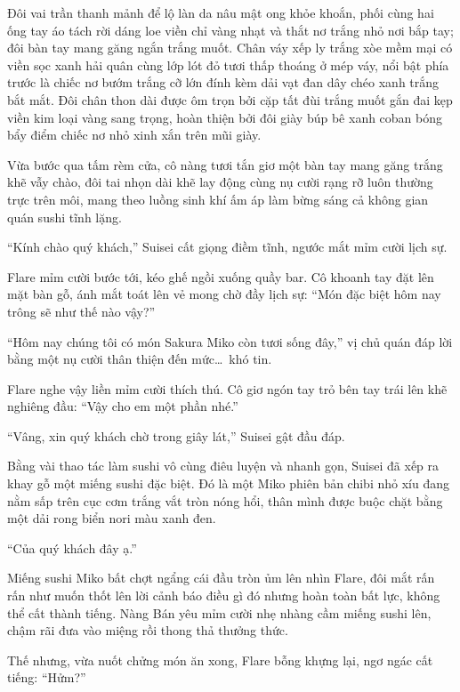 \documentclass[../main.tex]{subfiles}
\begin{document}
Đôi vai trần thanh mảnh để lộ làn da nâu mật ong khỏe khoắn, phối cùng hai ống tay áo tách rời dáng loe viền chỉ vàng nhạt và thắt nơ trắng nhỏ nơi bắp tay; đôi bàn tay mang găng ngắn trắng muốt. Chân váy xếp ly trắng xòe mềm mại có viền sọc xanh hải quân cùng lớp lót đỏ tươi thấp thoáng ở mép váy, nổi bật phía trước là chiếc nơ bướm trắng cỡ lớn đính kèm dải vạt đan dây chéo xanh trắng bắt mắt. Đôi chân thon dài được ôm trọn bởi cặp tất đùi trắng muốt gắn đai kẹp viền kim loại vàng sang trọng, hoàn thiện bởi đôi giày búp bê xanh coban bóng bẩy điểm chiếc nơ nhỏ xinh xắn trên mũi giày.

\chrint

Vừa bước qua tấm rèm cửa, cô nàng tươi tắn giơ một bàn tay mang găng trắng khẽ vẫy chào, đôi tai nhọn dài khẽ lay động cùng nụ cười rạng rỡ luôn thường trực trên môi, mang theo luồng sinh khí ấm áp làm bừng sáng cả không gian quán sushi tĩnh lặng.

``Kính chào quý khách,'' Suisei cất giọng điềm tĩnh, ngước mắt mỉm cười lịch sự.

Flare mỉm cười bước tới, kéo ghế ngồi xuống quầy bar. Cô khoanh tay đặt lên mặt bàn gỗ, ánh mắt toát lên vẻ mong chờ đầy lịch sự: ``Món đặc biệt hôm nay trông sẽ như thế nào vậy?''


``Hôm nay chúng tôi có món Sakura Miko còn tươi sống đây,'' vị chủ quán đáp lời bằng một nụ cười thân thiện đến mức\dots\ khó tin.

Flare nghe vậy liền mỉm cười thích thú. Cô giơ ngón tay trỏ bên tay trái lên khẽ nghiêng đầu: ``Vậy cho em một phần nhé.''

``Vâng, xin quý khách chờ trong giây lát,'' Suisei gật đầu đáp.

Bằng vài thao tác làm sushi vô cùng điêu luyện và nhanh gọn, Suisei đã xếp ra khay gỗ một miếng sushi đặc biệt. Đó là một Miko phiên bản chibi nhỏ xíu đang nằm sấp trên cục cơm trắng vắt tròn nóng hổi, thân mình được buộc chặt bằng một dải rong biển nori màu xanh đen.

``Của quý khách đây ạ.''

Miếng sushi Miko bất chợt ngẩng cái đầu tròn ủm lên nhìn Flare, đôi mắt rấn rấn như muốn thốt lên lời cảnh báo điều gì đó nhưng hoàn toàn bất lực, không thể cất thành tiếng. Nàng Bán yêu mỉm cười nhẹ nhàng cầm miếng sushi lên, chậm rãi đưa vào miệng rồi thong thả thưởng thức.


Thế nhưng, vừa nuốt chửng món ăn xong, Flare bỗng khựng lại, ngơ ngác cất tiếng: ``Hửm?''
\end{document}
